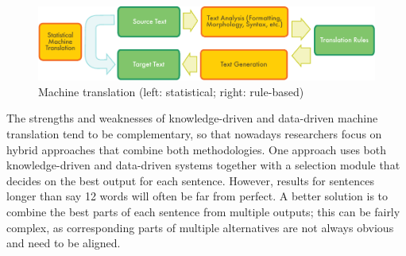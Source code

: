 \begin{multicols}{2}
\begin{figure}[htb]
  \center
  \includegraphics[width=\textwidth]{../_media/english/machine_translation}
  \caption{Machine translation (left: statistical; right: rule-based)}
  \label{fig:mtarch-eng}
\end{figure}

The strengths and weaknesses of knowledge-driven and data-driven machine
translation tend to be complementary, so that nowadays researchers focus on
hybrid approaches that combine both methodologies. One approach uses both
knowledge-driven and data-driven systems together with a selection module that
decides on the best output for each sentence. However, results for sentences
longer than say 12 words will often be far from perfect. A better solution is
to combine the best parts of each sentence from multiple outputs; this can be
fairly complex, as corresponding parts of multiple alternatives are not always
obvious and need to be aligned.


\end{multicols}
